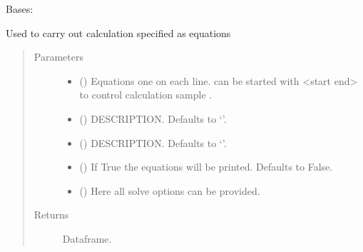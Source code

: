 \documentclass[letterpaper,10pt,english]{sphinxmanual}
\begin{document}

\begin{fulllineitems}
\label{\detokenize{used/modelmf:modelmf.mfcalc}}
\pysigstartsignatures
{}
\pysigstopsignatures
\sphinxAtStartPar
Bases: 

\sphinxAtStartPar
Used to carry out calculation specified as equations
\begin{quote}\begin{description}
\item[{Parameters}] \leavevmode\begin{itemize}
\item {} 
\sphinxAtStartPar
{} () \textendash{} Equations one on each line. can be started with \textless{}start end\textgreater{} to control calculation sample .

\item {} 
\sphinxAtStartPar
{} (\sphinxstyleliteralemphasis{\sphinxupquote{, }}) \textendash{} DESCRIPTION. Defaults to ‘’.

\item {} 
\sphinxAtStartPar
{} (\sphinxstyleliteralemphasis{\sphinxupquote{, }}) \textendash{} DESCRIPTION. Defaults to ‘’.

\item {} 
\sphinxAtStartPar
{} (\sphinxstyleliteralemphasis{\sphinxupquote{, }}) \textendash{} If True the equations will be printed. Defaults to False.

\item {} 
\sphinxAtStartPar
{} () \textendash{} Here all solve options can be provided.

\end{itemize}

\item[{Returns}] \leavevmode
\sphinxAtStartPar
Dataframe.

\end{description}\end{quote}

\end{fulllineitems}
\end{document}
